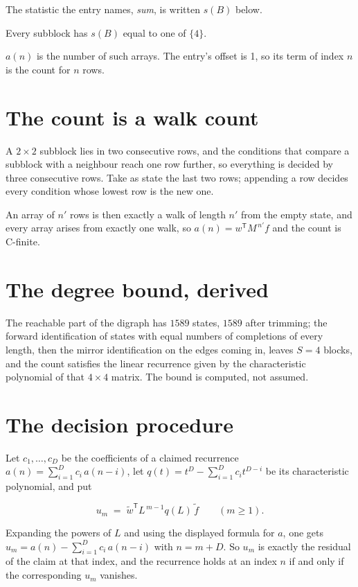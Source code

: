 \documentclass[11pt]{article}
\theoremstyle{definition}
\begin{document}
The statistic the entry names, {\itshape sum}, is written $s(B)$ below.

Every subblock has $s(B)$ equal to one of $\{4\}$.

$a(n)$ is the number of such arrays. The entry's offset is 1, so its term of index $n$ is the count for $n$ rows.

\section{The count is a walk count}

A $2\times2$ subblock lies in two consecutive rows, and the conditions that compare a subblock with a neighbour reach one row further, so everything is decided by three consecutive rows. Take as state the last two rows; appending a row decides every condition whose lowest row is the new one.

An array of $n'$ rows is then exactly a walk of length $n'$ from the empty state, and every array arises from exactly one walk, so $a(n) = w^{\mathsf T}M^{\,n'}f$ and the count is C-finite.

\section{The degree bound, derived}

The reachable part of the digraph has $1589$ states, $1589$ after trimming; the forward identification of states with equal numbers of completions of every length, then the mirror identification on the edges coming in, leaves $S = 4$ blocks, and the count satisfies the linear recurrence given by the characteristic polynomial of that $4\times4$ matrix. The bound is computed, not assumed.

\section{The decision procedure}

Let $c_1,\dots,c_D$ be the coefficients of a claimed recurrence $a(n) = \sum_{i=1}^{D} c_i\,a(n-i)$, let $q(t) = t^{D} - \sum_{i=1}^{D} c_i t^{D-i}$ be its characteristic polynomial, and put

\[u_m \;=\; \tilde w^{\mathsf T} L^{\,m-1} q(L)\,\tilde f \qquad (m \ge 1).\]

Expanding the powers of $L$ and using the displayed formula for $a$, one gets $u_m = a(n) - \sum_{i=1}^{D} c_i\,a(n-i)$ with $n = m + D$. So $u_m$ is exactly the residual of the claim at that index, and the recurrence holds at an index $n$ if and only if the corresponding $u_m$ vanishes.
\end{document}
